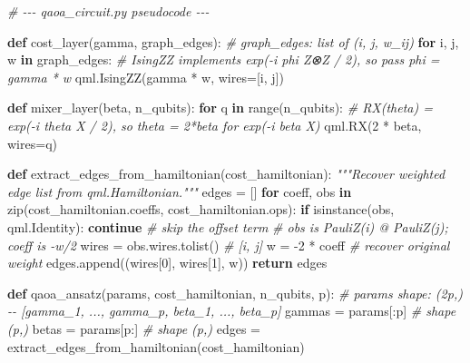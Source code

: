 \documentclass[
  11pt,
]{report}
\newenvironment{Shaded}{}{}
\newcommand{\BuiltInTok}[1]{\textcolor[rgb]{0.00,0.50,0.00}{#1}}
\newcommand{\CommentTok}[1]{\textcolor[rgb]{0.38,0.63,0.69}{\textit{#1}}}
\newcommand{\ControlFlowTok}[1]{\textcolor[rgb]{0.00,0.44,0.13}{\textbf{#1}}}
\newcommand{\DecValTok}[1]{\textcolor[rgb]{0.25,0.63,0.44}{#1}}
\newcommand{\KeywordTok}[1]{\textcolor[rgb]{0.00,0.44,0.13}{\textbf{#1}}}
\newcommand{\NormalTok}[1]{#1}
\newcommand{\OperatorTok}[1]{\textcolor[rgb]{0.40,0.40,0.40}{#1}}
\begin{document}
\begin{Shaded}
\begin{Highlighting}[]
\CommentTok{\# {-}{-}{-} qaoa\_circuit.py pseudocode {-}{-}{-}}

\KeywordTok{def}\NormalTok{ cost\_layer(gamma, graph\_edges):}
    \CommentTok{\# graph\_edges: list of (i, j, w\_ij)}
    \ControlFlowTok{for}\NormalTok{ i, j, w }\KeywordTok{in}\NormalTok{ graph\_edges:}
        \CommentTok{\# IsingZZ implements exp({-}i phi Z⊗Z / 2), so pass phi = gamma * w}
\NormalTok{        qml.IsingZZ(gamma }\OperatorTok{*}\NormalTok{ w, wires}\OperatorTok{=}\NormalTok{[i, j])}


\KeywordTok{def}\NormalTok{ mixer\_layer(beta, n\_qubits):}
    \ControlFlowTok{for}\NormalTok{ q }\KeywordTok{in} \BuiltInTok{range}\NormalTok{(n\_qubits):}
        \CommentTok{\# RX(theta) = exp({-}i theta X / 2), so theta = 2*beta for exp({-}i beta X)}
\NormalTok{        qml.RX(}\DecValTok{2} \OperatorTok{*}\NormalTok{ beta, wires}\OperatorTok{=}\NormalTok{q)}


\KeywordTok{def}\NormalTok{ extract\_edges\_from\_hamiltonian(cost\_hamiltonian):}
    \CommentTok{"""Recover weighted edge list from qml.Hamiltonian."""}
\NormalTok{    edges }\OperatorTok{=}\NormalTok{ []}
    \ControlFlowTok{for}\NormalTok{ coeff, obs }\KeywordTok{in} \BuiltInTok{zip}\NormalTok{(cost\_hamiltonian.coeffs, cost\_hamiltonian.ops):}
        \ControlFlowTok{if} \BuiltInTok{isinstance}\NormalTok{(obs, qml.Identity):}
            \ControlFlowTok{continue}  \CommentTok{\# skip the offset term}
        \CommentTok{\# obs is PauliZ(i) @ PauliZ(j); coeff is {-}w/2}
\NormalTok{        wires }\OperatorTok{=}\NormalTok{ obs.wires.tolist()       }\CommentTok{\# [i, j]}
\NormalTok{        w }\OperatorTok{=} \OperatorTok{{-}}\DecValTok{2} \OperatorTok{*}\NormalTok{ coeff                   }\CommentTok{\# recover original weight}
\NormalTok{        edges.append((wires[}\DecValTok{0}\NormalTok{], wires[}\DecValTok{1}\NormalTok{], w))}
    \ControlFlowTok{return}\NormalTok{ edges}


\KeywordTok{def}\NormalTok{ qaoa\_ansatz(params, cost\_hamiltonian, n\_qubits, p):}
    \CommentTok{\# params shape: (2p,) {-}{-} [gamma\_1, ..., gamma\_p, beta\_1, ..., beta\_p]}
\NormalTok{    gammas }\OperatorTok{=}\NormalTok{ params[:p]                  }\CommentTok{\# shape (p,)}
\NormalTok{    betas }\OperatorTok{=}\NormalTok{ params[p:]                   }\CommentTok{\# shape (p,)}
\NormalTok{    edges }\OperatorTok{=}\NormalTok{ extract\_edges\_from\_hamiltonian(cost\_hamiltonian)}


\end{Highlighting}
\end{Shaded}
\end{document}
